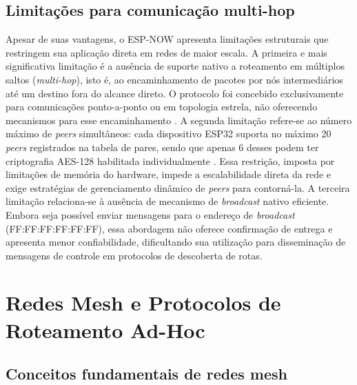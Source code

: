 \subsection{Limitações para comunicação
multi-hop}\label{limitauxe7uxf5es-para-comunicauxe7uxe3o-multi-hop}

Apesar de suas vantagens, o ESP-NOW apresenta limitações estruturais que
restringem sua aplicação direta em redes de maior escala. A primeira e
mais significativa limitação é a ausência de suporte nativo a roteamento
em múltiplos saltos (\emph{multi-hop}), isto é, ao encaminhamento de
pacotes por nós intermediários até um destino fora do alcance direto. O
protocolo foi concebido exclusivamente para comunicações
ponto-a-ponto ou em topologia estrela, não oferecendo mecanismos para
esse encaminhamento \cite{becker2025}. A segunda limitação refere-se ao número máximo de
\emph{peers} simultâneos: cada dispositivo ESP32 suporta no máximo
20 \emph{peers} registrados na tabela de pares, sendo que apenas 6
desses podem ter criptografia AES-128 habilitada individualmente
\cite{espressif2024}. Essa restrição, imposta por limitações de memória
do hardware, impede a escalabilidade direta da rede e exige estratégias
de gerenciamento dinâmico de \emph{peers} para contorná-la. A terceira limitação relaciona-se à
ausência de mecanismo de \emph{broadcast} nativo eficiente. Embora seja
possível enviar mensagens para o endereço de \emph{broadcast}
(FF:FF:FF:FF:FF:FF), essa abordagem não oferece confirmação de entrega e
apresenta menor confiabilidade, dificultando sua utilização para
disseminação de mensagens de controle em protocolos de descoberta de
rotas.

\section{Redes Mesh e Protocolos de Roteamento
Ad-Hoc}\label{redes-mesh-e-protocolos-de-roteamento-ad-hoc}

\subsection{Conceitos fundamentais de redes
mesh}\label{conceitos-fundamentais-de-redes-mesh}


